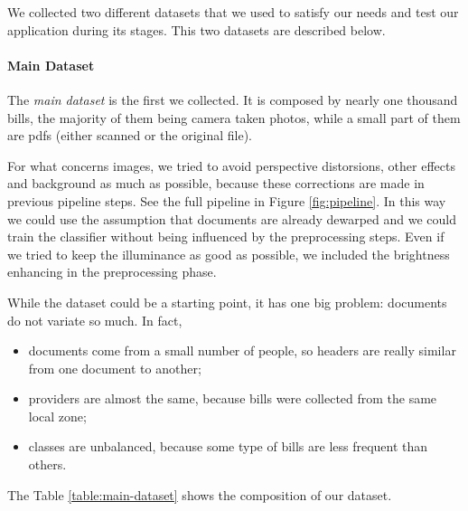 \documentclass[10pt,twocolumn,letterpaper]{article}
\begin{document}
We collected two different datasets that we used to satisfy our needs
and test our application during its stages. This two datasets are
described below.

\paragraph{Main Dataset}
\label{par:main-dataset}

The \emph{main dataset} is the first we collected. It is composed by
nearly one thousand bills, the majority of them being camera taken
photos, while a small part of them are pdfs (either scanned or the
original file).

For what concerns images, we tried to avoid perspective distorsions,
other effects and background as much as possible, because these
corrections are made in previous pipeline steps. See the full pipeline
in Figure \ref{fig:pipeline}.  In this way we could use the assumption
that documents are already dewarped and we could train the classifier
without being influenced by the preprocessing steps. Even if we tried
to keep the illuminance as good as possible, we included the
brightness enhancing in the preprocessing phase.

While the dataset could be a starting point, it has one big problem:
documents do not variate so much. In fact,

\begin{itemize}
  \item documents come from a small number of people, so headers are
    really similar from one document to another;
  \item providers are almost the same, because bills were collected
    from the same local zone;
  \item classes are unbalanced, because some type of bills are less
    frequent than others.
\end{itemize}

The Table \ref{table:main-dataset} shows the composition of our
dataset.
\end{document}
